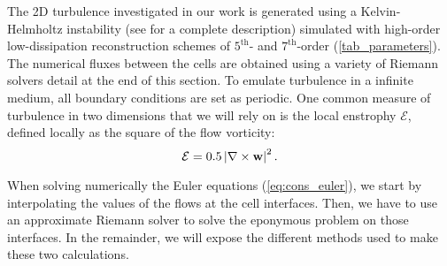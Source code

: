 The 2D turbulence investigated in our work
is generated using a Kelvin-Helmholtz instability (see \cite{san2015evaluation} for a complete description)
simulated with high-order low-dissipation  reconstruction schemes of $5^{\text{th}}$- and $7^{\text{th}}$-order (\autoref{tab_parameters}).
The numerical fluxes between the cells are obtained using a variety of Riemann solvers detail at the end of this section.
To emulate turbulence in a infinite medium, all boundary conditions are set as periodic.
One common measure of turbulence in two dimensions that we will rely on is the 
local enstrophy $\mathcal{E}$, defined locally as the square of the flow vorticity:
\eqSpace
\begin{equation}
    \mathcal{E} = 0.5\left\vert\nabla\times\mathbf{w}\right\vert^2.
    \label{eq:enstrophy}
    \eqSpace
\end{equation}



When solving numerically the Euler equations  (\autoref{eq:cons_euler}), we 
start by interpolating the values of the flows at the cell interfaces.
Then, we have
to use an approximate Riemann solver
\cite{toro2013riemann}
to solve the eponymous problem 
on those interfaces.
In the remainder,
we will expose the different
methods used to make these two
calculations.


